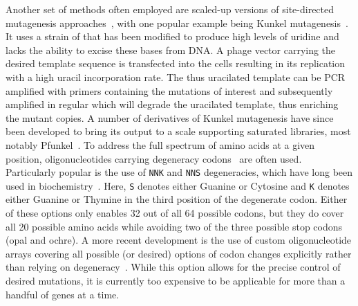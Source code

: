 Another set of methods often employed are scaled-up versions of site-directed mutagenesis approaches~\cite{hutchison_mutagenesis_1978,seyfang_multiple_2004,firnberg_pfunkel:_2012}, with one popular example being Kunkel mutagenesis~\cite{kunkel_rapid_1985}. It uses a strain of  that has been modified to produce high levels of uridine and lacks the ability to excise these bases from DNA. A phage vector carrying the desired template sequence is transfected into the cells resulting in its replication with a high uracil incorporation rate. The thus uracilated template can be PCR amplified with primers containing the mutations of interest and subsequently amplified in regular  which will degrade the uracilated template, thus enriching the mutant copies. A number of derivatives of Kunkel mutagenesis have since been developed to bring its output to a scale supporting saturated libraries, most notably Pfunkel~\cite{firnberg_pfunkel:_2012}.
To address the full spectrum of amino acids at a given position, oligonucleotides carrying degeneracy codons~\cite{pal_methods_2005} are often used. Particularly popular is the use of \texttt{NNK} and \texttt{NNS} degeneracies, which have long been used in biochemistry~\cite{scott_searching_1990,barbas_semisynthetic_1992}. Here, \texttt{S} denotes either Guanine or Cytosine and \texttt{K} denotes either Guanine or Thymine in the third position of the degenerate codon. Either of these options only enables 32 out of all 64 possible codons, but they do cover all 20 possible amino acids while avoiding two of the three possible stop codons (opal and ochre). A more recent development is the use of custom oligonucleotide arrays covering all possible (or desired) options of codon changes explicitly rather than relying on degeneracy~\cite{kitzman_massively_2015}. While this option allows for the precise control of desired mutations, it is currently too expensive to be applicable for more than a handful of genes at a time.

